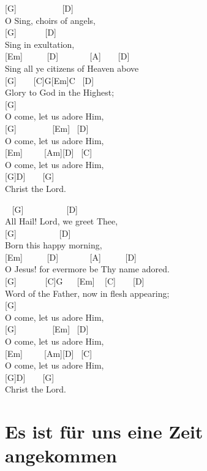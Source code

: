 \documentclass[
  letterpaper,
]{scrbook}
\begin{document}
{[}G{]} ~ ~ ~ ~ ~ ~ {[}D{]}\\
O Sing, choirs of angels,\\
{[}G{]} ~ ~ ~ ~{[}D{]}\\
Sing in exultation,\\
{[}Em{]} ~ ~ ~ {[}D{]} ~ ~ ~ ~ {[}A{]} ~ ~ {[}D{]}\\
Sing all ye citizens of Heaven above\\
{[}G{]} ~ ~ {[}C{]}G{[}Em{]}C ~{[}D{]}\\
Glory to God in the Highest;\\
{[}G{]}\\
O come, let us adore Him,\\
{[}G{]} ~ ~ ~ ~ ~{[}Em{]} ~{[}D{]}\\
O come, let us adore Him,\\
{[}Em{]} ~ ~ ~{[}Am{]}{[}D{]} ~{[}C{]}\\
O come, let us adore Him,\\
{[}G{]}D{]} ~ ~ {[}G{]}\\
Christ the Lord.

~ {[}G{]} ~ ~ ~ ~ ~ ~{[}D{]}\\
All Hail! Lord, we greet Thee,\\
{[}G{]} ~ ~ ~ ~ ~ ~{[}D{]}\\
Born this happy morning,\\
{[}Em{]} ~ ~ ~ {[}D{]} ~ ~ ~ ~ {[}A{]} ~ ~ ~ {[}D{]}\\
O Jesus! for evermore be Thy name adored.\\
{[}G{]} ~ ~ ~ ~{[}C{]}G ~ ~{[}Em{]} ~ {[}C{]} ~ ~ {[}D{]}\\
Word of the Father, now in flesh appearing;\\
{[}G{]}\\
O come, let us adore Him,\\
{[}G{]} ~ ~ ~ ~ ~{[}Em{]} ~{[}D{]}\\
O come, let us adore Him,\\
{[}Em{]} ~ ~ ~{[}Am{]}{[}D{]} ~{[}C{]}\\
O come, let us adore Him,\\
{[}G{]}D{]} ~ ~ {[}G{]}\\
Christ the Lord.

\hypertarget{es-ist-fuxfcr-uns-eine-zeit-angekommen}{%
\chapter{Es ist für uns eine Zeit
angekommen}\label{es-ist-fuxfcr-uns-eine-zeit-angekommen}}
\end{document}
